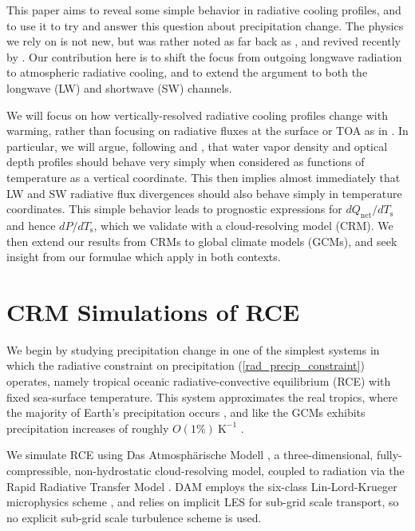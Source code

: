 \documentclass[10pt]{article}
\newcommand{\eqnref}[1]{(\ref{#1})}
\newcommand{\Qnet}{\ensuremath{Q_\mathrm{net}}}
\newcommand{\Ts}{\ensuremath{T_\mathrm{s}}}
\newcommand{\Kinverse}{\ensuremath{\mathrm{K^{-1}}}}
\begin{document}
This paper aims to reveal some simple behavior in radiative cooling profiles, and to use it to try and answer this question about precipitation change. The physics we rely on is not new, but was rather noted as far back as \cite{simpson1928}, and revived recently by \cite{ingram2010}. Our contribution here is to shift the focus from outgoing longwave radiation to atmospheric radiative cooling, and to extend the argument to both the longwave (LW) and shortwave (SW) channels. 

We will  focus on how vertically-resolved radiative cooling profiles change with warming, rather than focusing on radiative fluxes at the surface or TOA as in \cite{pendergrass2014}. In particular, we will argue, following \cite{simpson1928} and \cite{ingram2010}, that water vapor density and optical depth profiles should behave very simply when considered as functions of temperature as a vertical coordinate. This then implies almost immediately that LW and SW radiative flux divergences should also behave simply in temperature coordinates. This simple behavior leads to prognostic expressions for $d\Qnet/d\Ts$ and hence $dP/d\Ts$, which we validate with a cloud-resolving model (CRM). We then extend our results from CRMs to global climate models (GCMs),  and seek insight from our formulae which apply in both contexts. 


\section{CRM Simulations of RCE}
We begin by studying precipitation change in one of the simplest systems in which the radiative constraint on precipitation \eqnref{rad_precip_constraint} operates, namely tropical oceanic radiative-convective equilibrium (RCE) with fixed sea-surface temperature. This system approximates the real tropics, where the majority of Earth's precipitation occurs \citep{simpson1988}, and like the GCMs exhibits precipitation increases of roughly $O(1\%)\ \Kinverse$ \citep{romps2011, muller2011b}.  

We simulate RCE using Das Atmosph\"arische Modell \citep[DAM,][]{romps2008},   a three-dimensional, fully-compressible, non-hydrostatic cloud-resolving model, coupled to radiation via the Rapid Radiative Transfer Model 
\citep[RRTM,][]{mlawer1997}. DAM employs the six-class Lin-Lord-Krueger  microphysics scheme \citep{lin1983, lord1984, krueger1995}, and relies on implicit LES \citep{margolin2006} for sub-grid scale transport, so no explicit sub-grid scale turbulence scheme is used.
	
\end{document}
